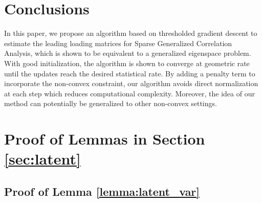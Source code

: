 \documentclass[11pt]{article}
\newcommand{\0}{{\mathbf{0}}}
\begin{document}
\section{Conclusions}
In this paper, we propose an algorithm based on thresholded gradient descent to estimate the leading loading matrices for Sparse Generalized Correlation Analysis, which is shown to be equivalent to a generalized eigenspace problem. With good initialization, the algorithm is shown to converge at geometric rate until the updates reach the desired statistical rate. By adding a penalty term to incorporate the non-convex constraint, our algorithm avoids direct normalization at each step which reduces computational complexity. Moreover, the idea of our method can potentially be generalized to other non-convex settings.
\iffalse
\par There are several future directions for the Sparse GCA. First, it will be interesting to understand what kind of constrained optimization problem can be solved using penalized gradient descent. Moreover, our algorithm and analysis only leverage the fact that there are $s$ support in total, ignoring that for each $p_i$ dimension we only have $s_i$ support. It may lead to some improvement if we can make use of that information.  Another direction maybe exploring whether the initialization step is indeed necessary. According to recent advance in non-convex optimization, random initialization will also lead to convergence for certain problems. It would be interesting to see whether random initialization scheme works for Sparse PCA or more generally Sparse GCA. Finally, it will be promising to apply our algorithm to real data application to find generalized correlations among multiple dataset. 
\fi
\fi

\appendix
\section{Proof of Lemmas in Section \ref{sec:latent}}

\subsection{Proof of Lemma \ref{lemma:latent_var}}
\end{document}
